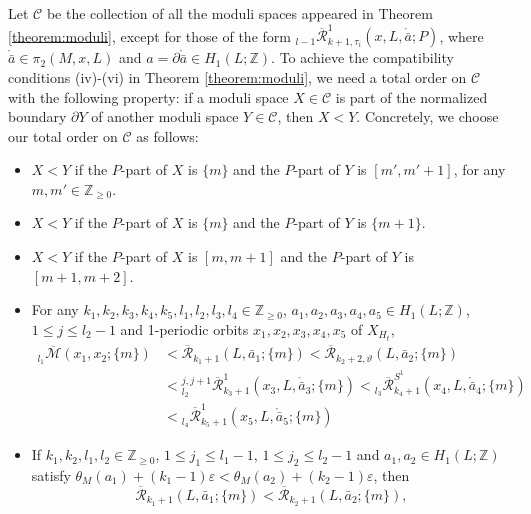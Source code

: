 \documentclass[a4paper]{article}
\numberwithin{equation}{section}
\begin{document}
Let $\mathcal{C}$ be the collection of all the moduli spaces appeared in Theorem \ref{theorem:moduli}, except for those of the form ${}_{l-1}\overline{\mathcal{R}}_{k+1,\tau_i}^1(x,L,\ring{\bar{a}};P)$, where $\ring{\bar{a}}\in\pi_2(M,x,L)$ and $a=\partial\ring{\bar{a}}\in H_1(L;\mathbb{Z})$. To achieve the compatibility conditions (iv)-(vi) in Theorem \ref{theorem:moduli}, we need a total order on $\mathcal{C}$ with the following property: if a moduli space $X\in\mathcal{C}$ is part of the normalized boundary $\partial Y$ of another moduli space $Y\in\mathcal{C}$, then $X<Y$. Concretely, we choose our total order on $\mathcal{C}$ as follows:
\begin{itemize}
	\item[(i)] $X<Y$ if the $P$-part of $X$ is $\{m\}$ and the $P$-part of $Y$ is $[m',m'+1]$, for any $m,m'\in\mathbb{Z}_{\geq0}$.
	\item[(ii)] $X<Y$ if the $P$-part of $X$ is $\{m\}$ and the $P$-part of $Y$ is $\{m+1\}$.
	\item[(iii)] $X<Y$ if the $P$-part of $X$ is $[m,m+1]$ and the $P$-part of $Y$ is $[m+1,m+2]$.
	\item[(iv)] For any $k_1,k_2,k_3,k_4,k_5,l_1,l_2,l_3,l_4\in\mathbb{Z}_{\geq0}$, $a_1,a_2,a_3,a_4,a_5\in H_1(L;\mathbb{Z})$, $1\leq j\leq l_2-1$ and 1-periodic orbits $x_1,x_2,x_3,x_4,x_5$ of $X_{H_t}$,
	\begin{equation}
	\begin{split}
	{}_{l_1}\overline{\mathcal{M}}(x_1,x_2;\{m\})&<\overline{\mathcal{R}}_{k_1+1}(L,\bar{a}_1;\{m\})<\overline{\mathcal{R}}_{k_2+2,\vartheta}(L,\bar{a}_2;\{m\}) \\
	&<{}_{l_2}^{j,j+1}\overline{\mathcal{R}}_{k_3+1}^1(x_3,L,\ring{\bar{a}}_3;\{m\})<{}_{l_3}\overline{\mathcal{R}}_{k_4+1}^{S^1}(x_4,L,\ring{\bar{a}}_4;\{m\}) \\
	&<{}_{l_4}\overline{\mathcal{R}}_{k_5+1}^1(x_5,L,\ring{\bar{a}}_5;\{m\})
	\end{split}
	\end{equation}
    \item[(v)] If $k_1,k_2,l_1,l_2\in\mathbb{Z}_{\geq0}$, $1\leq j_1\leq l_1-1$, $1\leq j_2\leq l_2-1$ and $a_1,a_2\in H_1(L;\mathbb{Z})$ satisfy $\theta_M(a_1)+(k_1-1)\varepsilon<\theta_M(a_2)+(k_2-1)\varepsilon$, then
    \begin{equation}
    \overline{\mathcal{R}}_{k_1+1}(L,\bar{a}_1;\{m\})<\overline{\mathcal{R}}_{k_2+1}(L,\bar{a}_2;\{m\}),
    \end{equation}
    \begin{equation}

\end{equation}
\end{itemize}
\end{document}
